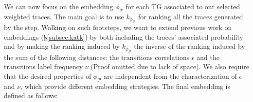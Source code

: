 {We can now focus on the embedding $\phi_{\mathcal{P}}$ for each TG associated to our selected weighted traces. The main goal is to use $k_{\phi_\mathcal{P}}$ for ranking all the traces generated by the \unravelling step. Walking on such footsteps, we  want to extend  previous work on embeddings (\S\ref{subsec:katk}) by both including the traces' associated probability and by making the ranking induced by $k_{\phi_\mathcal{P}}$ the inverse of the ranking induced by the sum of the following distances: the transitions correlations $\epsilon$ and the transitions label frequency $\nu$ ({Proof omitted due to lack of space}). }
{We also require that the desired properties of $\phi_{\mathcal{P}}$ are independent from the characterization of $\epsilon$ and $\nu$, which  provide different embedding strategies. } The final embedding is defined as follows:


